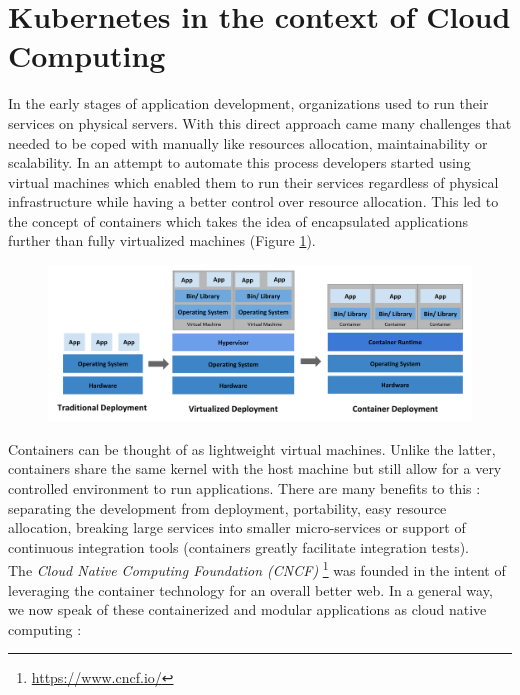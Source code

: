 \section{Kubernetes in the context of Cloud Computing}

In the early stages of application development, organizations used to run their
services on physical servers. With this direct approach came many challenges
that needed to be coped with manually like resources allocation,
maintainability or scalability. In an attempt to automate this process
developers started using virtual machines which enabled them to run their
services regardless of physical infrastructure while having a better control
over resource allocation.  This led to the concept of containers which takes
the idea of encapsulated applications further than fully virtualized machines
(Figure \ref{fig:container-evolution}).

\begin{figure}[h]
	\centering
	\includegraphics[width=\textwidth]{./../imgs/container_evolution.png}
	\label{fig:container-evolution}
\end{figure}

Containers can be thought of as lightweight virtual machines. Unlike the
latter, containers share the same kernel with the host machine but still allow
for a very controlled environment to run applications. There are many
benefits to this : separating the development from deployment, portability,
easy resource allocation, breaking large services into smaller micro-services
or support of continuous integration tools (containers greatly facilitate
integration tests).\\

The \textit{Cloud Native Computing Foundation (CNCF)
}\footnote{\url{https://www.cncf.io/}} was founded in the intent of leveraging
the container technology for an overall better web. In a general way, we now
speak of these containerized and modular applications as cloud native computing
:

